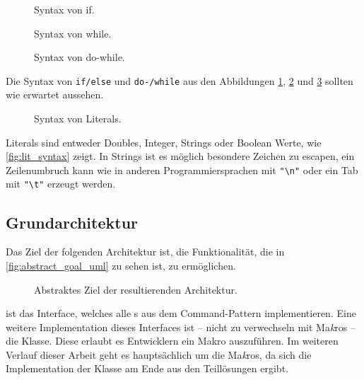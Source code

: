     \begin{figure}[H]
      \centering
      \caption{Syntax von if.}
      \label{fig:if_syntax}
    \end{figure}

    \begin{figure}[H]
      \centering
      \caption{Syntax von while.}
      \label{fig:while_syntax}
    \end{figure}

    \begin{figure}[H]
      \centering
      \caption{Syntax von do-while.}
      \label{fig:do_while_syntax}
    \end{figure}
    Die Syntax von \lstinline[style=MyMacroStyle]$if/else$ und \lstinline[style=MyMacroStyle]$do-/while$ aus den Abbildungen \ref{fig:if_syntax}, \ref{fig:while_syntax} und \ref{fig:do_while_syntax} sollten wie erwartet aussehen.

    \begin{figure}[H]
      \centering
      \caption{Syntax von Literals.}
      \label{fig:lit_syntax}
    \end{figure}
    Literals sind entweder Doubles, Integer, Strings oder Boolean Werte, wie \autoref{fig:lit_syntax} zeigt. In Strings ist es möglich besondere Zeichen zu escapen, ein Zeilenumbruch kann wie in anderen Programmiersprachen mit \lstinline[style=MyMacroStyle]$"\n"$ oder ein Tab mit \lstinline[style=MyMacroStyle]$"\t"$  erzeugt werden.


  \subsection{Grundarchitektur}
  \label{ssec:Grundarchitektur}
    Das Ziel der folgenden Architektur ist, die Funktionalität, die in \autoref{fig:abstract_goal_uml} zu sehen ist, zu ermöglichen.

    \begin{figure}[H]
      \centering
      \caption{Abstraktes Ziel der resultierenden Architektur.}
      \label{fig:abstract_goal_uml}
    \end{figure}
     ist das Interface, welches alle s aus dem Command-Pattern implementieren. Eine weitere Implementation dieses Interfaces ist -- nicht zu verwechseln mit Ma\emph{k}ros -- die  Klasse. Diese erlaubt es Entwicklern ein Makro auszuführen. Im weiteren Verlauf dieser Arbeit geht es hauptsächlich um die Ma\emph{k}ros, da sich die Implementation der  Klasse am Ende aus den Teillösungen ergibt.


